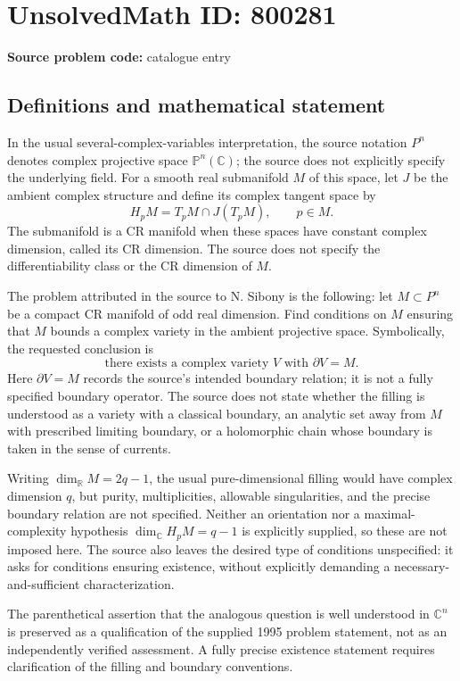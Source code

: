 \documentclass[11pt]{article}
\newcommand{\R}{\mathbb{R}}
\newcommand{\C}{\mathbb{C}}
\begin{document}
\section*{UnsolvedMath ID: 800281}
\textbf{Source problem code:} catalogue entry
\subsection{Definitions and mathematical statement}
In the usual several-complex-variables interpretation, the source notation \(P^n\) denotes complex projective space \(\mathbb{P}^n(\C)\); the source does not explicitly specify the underlying field. For a smooth real submanifold \(M\) of this space, let \(J\) be the ambient complex structure and define its complex tangent space by
\[
H_pM=T_pM\cap J(T_pM),\qquad p\in M.
\]
The submanifold is a CR manifold when these spaces have constant complex dimension, called its CR dimension. The source does not specify the differentiability class or the CR dimension of \(M\).

The problem attributed in the source to N. Sibony is the following: let \(M\subset P^n\) be a compact CR manifold of odd real dimension. Find conditions on \(M\) ensuring that \(M\) bounds a complex variety in the ambient projective space. Symbolically, the requested conclusion is
\[
\text{there exists a complex variety }V\text{ with }\partial V=M.
\]
Here \(\partial V=M\) records the source's intended boundary relation; it is not a fully specified boundary operator. The source does not state whether the filling is understood as a variety with a classical boundary, an analytic set away from \(M\) with prescribed limiting boundary, or a holomorphic chain whose boundary is taken in the sense of currents.

Writing \(\dim_{\R}M=2q-1\), the usual pure-dimensional filling would have complex dimension \(q\), but purity, multiplicities, allowable singularities, and the precise boundary relation are not specified. Neither an orientation nor a maximal-complexity hypothesis \(\dim_{\C}H_pM=q-1\) is explicitly supplied, so these are not imposed here. The source also leaves the desired type of conditions unspecified: it asks for conditions ensuring existence, without explicitly demanding a necessary-and-sufficient characterization.

The parenthetical assertion that the analogous question is well understood in \(\C^n\) is preserved as a qualification of the supplied 1995 problem statement, not as an independently verified assessment. A fully precise existence statement requires clarification of the filling and boundary conventions.
\end{document}
